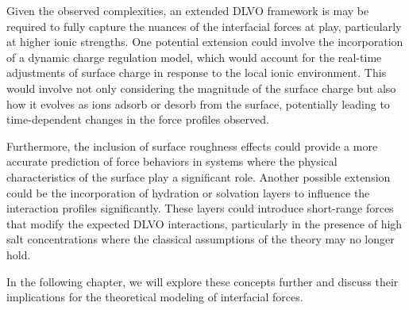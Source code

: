 Given the observed complexities, an extended DLVO framework is may be required to fully capture the nuances of the interfacial forces at play, particularly at higher ionic strengths. One potential extension could involve the incorporation of a dynamic charge regulation model, which would account for the real-time adjustments of surface charge in response to the local ionic environment. This would involve not only considering the magnitude of the surface charge but also how it evolves as ions adsorb or desorb from the surface, potentially leading to time-dependent changes in the force profiles observed.

Furthermore, the inclusion of surface roughness effects could provide a more accurate prediction of force behaviors in systems where the physical characteristics of the surface play a significant role. Another possible extension could be the incorporation of hydration or solvation layers to influence the interaction profiles significantly. These layers could introduce short-range forces that modify the expected DLVO interactions, particularly in the presence of high salt concentrations where the classical assumptions of the theory may no longer hold.

In the following chapter, we will explore these concepts further and discuss their implications for the theoretical modeling of interfacial forces.